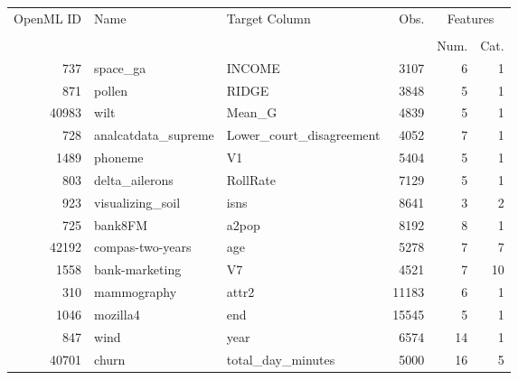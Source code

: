 \begin{table}[h!]
\centering
\begin{tabular}{rllrrr}
\toprule
\multirow{2}{*}{OpenML ID} & \multirow{2}{*}{Name} & \multirow{2}{*}{Target Column} & \multirow{2}{*}{Obs.} & \multicolumn{2}{c}{Features} \\ \cline{5-6}
\\[-0.75em]
&                       &                    &        & Num.    & Cat.   \\
\midrule
       737 &                       space\_ga & INCOME &         3107 &                6 &                1 \\
       871 &                         pollen &     RIDGE &    3848 &                5 &                1 \\
     40983 &                           wilt &    Mean\_G &     4839 &                5 &                1 \\
       728 &            analcatdata\_supreme &    Lower\_court\_disagreement &     4052 &                7 &                1 \\
      1489 &                        phoneme &     V1 &    5404 &                5 &                1 \\
       803 &                 delta\_ailerons &   RollRate &      7129 &                5 &                1 \\
       923 &               visualizing\_soil &     isns &    8641 &                3 &                2 \\
       725 &                        bank8FM &     a2pop &    8192 &                8 &                1 \\
     42192 &               compas-two-years &   age &      5278 &                7 &                7 \\
      1558 &                 bank-marketing &    V7 &     4521 &                7 &               10 \\
       310 &                    mammography &   attr2 &     11183 &                6 &                1 \\
      1046 &                       mozilla4 &    end &    15545 &                5 &                1 \\
       847 &                           wind &      year &   6574 &               14 &                1 \\
     40701 &                          churn &    total\_day\_minutes &     5000 &               16 &                5 \\

\end{tabular}
\end{table}
